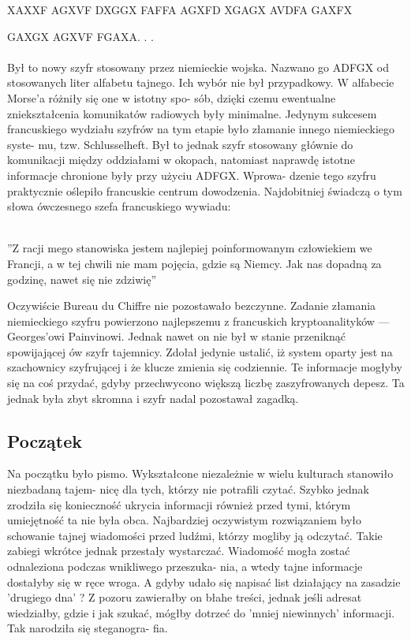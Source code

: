 \documentclass[a4paper]{article}
\begin{document}
\par  XAXXF AGXVF DXGGX FAFFA AGXFD XGAGX AVDFA GAXFX
\par GAXGX AGXVF FGAXA. . .\\
\\
Był to nowy szyfr stosowany przez niemieckie wojska. Nazwano go ADFGX od stosowanych liter
alfabetu tajnego. Ich wybór nie był przypadkowy. W alfabecie Morse’a różniły się one w istotny spo-
sób, dzięki czemu ewentualne zniekształcenia komunikatów radiowych były minimalne. Jedynym
sukcesem francuskiego wydziału szyfrów na tym etapie było złamanie innego niemieckiego syste-
mu, tzw. Schlusselheft. Był to jednak szyfr stosowany głównie do komunikacji między oddziałami
w okopach, natomiast naprawdę istotne informacje chronione były przy użyciu ADFGX. Wprowa-
dzenie tego szyfru praktycznie oślepiło francuskie centrum dowodzenia. Najdobitniej świadczą o
tym słowa ówczesnego szefa francuskiego wywiadu:\\
\\
\begin{center} ”Z racji mego stanowiska jestem najlepiej poinformowanym człowiekiem we Francji, a w tej chwili
nie mam pojęcia, gdzie są Niemcy. Jak nas dopadną za godzinę, nawet się nie zdziwię”\cite{1}
\end{center}
Oczywiście Bureau du Chiffre nie pozostawało bezczynne. Zadanie złamania niemieckiego szyfru
powierzono najlepszemu z francuskich kryptoanalityków — Georges’owi Painvinowi. Jednak nawet
on nie był w stanie przeniknąć spowijającej ów szyfr tajemnicy. Zdołał jedynie ustalić, iż system
oparty jest na szachownicy szyfrującej i że klucze zmienia się codziennie. Te informacje mogłyby się
na coś przydać, gdyby przechwycono większą liczbę zaszyfrowanych depesz. Ta jednak była zbyt
skromna i szyfr nadal pozostawał zagadką.
\subsection{Początek}
Na początku było pismo. Wykształcone niezależnie w wielu kulturach stanowiło niezbadaną tajem-
nicę dla tych, którzy nie potrafili czytać. Szybko jednak zrodziła się konieczność ukrycia informacji
również przed tymi, którym umiejętność ta nie była obca. Najbardziej oczywistym rozwiązaniem
było schowanie tajnej wiadomości przed ludźmi, którzy mogliby ją odczytać. Takie zabiegi wkrótce
jednak przestały wystarczać. Wiadomość mogła zostać odnaleziona podczas wnikliwego przeszuka-
nia, a wtedy tajne informacje dostałyby się w ręce wroga. A gdyby udało się napisać list działający
na zasadzie ’drugiego dna’ ? Z pozoru zawierałby on błahe treści, jednak jeśli adresat wiedziałby,
gdzie i jak szukać, mógłby dotrzeć do ’mniej niewinnych’ informacji. Tak narodziła się steganogra-
fia.
\end{document}
